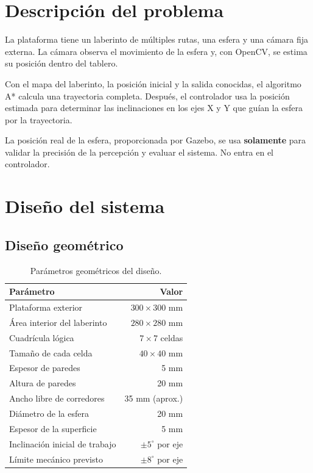 \documentclass[11pt,a4paper]{article}
\begin{document}
\section{Descripción del problema}
La plataforma tiene un laberinto de múltiples rutas, una esfera y una cámara fija externa. La cámara observa el movimiento de la esfera y, con OpenCV, se estima su posición dentro del tablero.

Con el mapa del laberinto, la posición inicial y la salida conocidas, el algoritmo A* calcula una trayectoria completa. Después, el controlador usa la posición estimada para determinar las inclinaciones en los ejes X y Y que guían la esfera por la trayectoria.

La posición real de la esfera, proporcionada por Gazebo, se usa \textbf{solamente} para validar la precisión de la percepción y evaluar el sistema. No entra en el controlador.

\section{Diseño del sistema}

\subsection{Diseño geométrico}
\begin{table}[H]
    \centering
    \begin{tabular}{@{}lr@{}}
        \toprule
        \textbf{Parámetro} & \textbf{Valor} \\
        \midrule
        Plataforma exterior & $300 \times 300$ mm \\
        Área interior del laberinto & $280 \times 280$ mm \\
        Cuadrícula lógica & $7 \times 7$ celdas \\
        Tamaño de cada celda & $40 \times 40$ mm \\
        Espesor de paredes & 5 mm \\
        Altura de paredes & 20 mm \\
        Ancho libre de corredores & 35 mm (aprox.) \\
        Diámetro de la esfera & 20 mm \\
        Espesor de la superficie & 5 mm \\
        Inclinación inicial de trabajo & $\pm 5^\circ$ por eje \\
        Límite mecánico previsto & $\pm 8^\circ$ por eje \\
        \bottomrule
    \end{tabular}
    \caption{Parámetros geométricos del diseño.}
\end{table}
\end{document}
